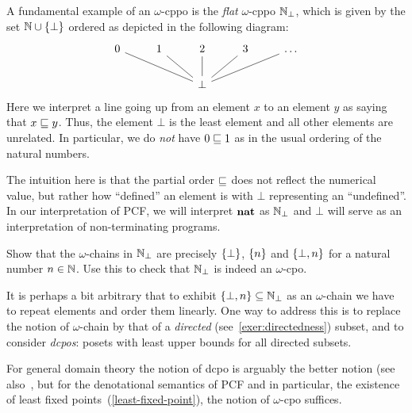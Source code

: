 \begin{example}[\(\Nat_\bot\)]\label{exam:N_bot}
  A fundamental example of an \(\omega\)-cppo is the \emph{flat} \(\omega\)-cppo
  \(\Nat_\bot\), which is given by the set \(\mathbb N \cup \{\bot\}\) ordered as
  depicted in the following diagram:
  \[
    \begin{tikzcd}
      0 & 1 & 2 & 3 & \ldots \\
      & & \bot \ar[ull,no head] \ar[ul,no head] \ar[u,no head] \ar[ur, no head]
      \ar[urr, no head]
    \end{tikzcd}
  \]
  Here we interpret a line going up from an element \(x\) to an element \(y\) as
  saying that \(x \sqsubseteq y\).
  Thus, the element \(\bot\) is the least element and all other elements are
  unrelated.
  In particular, we do \emph{not} have \(0 \sqsubseteq 1\) as in the usual
  ordering of the natural numbers.

  The intuition here is that the partial order \({\sqsubseteq}\) does not reflect the
  numerical value, but rather how ``defined'' an element is with \(\bot\)
  representing an ``undefined''.
  In our interpretation of PCF, we will interpret \(\mathtt{\mathbf{nat}}\) as \(\Nat_\bot\)
  and \(\bot\) will serve as an interpretation of non-terminating programs.
\end{example}

\begin{exercise}\label{exer:N_bot}
  Show that the \(\omega\)-chains in \(\Nat_\bot\) are precisely \(\{\bot\}\),
  \(\{n\}\) and \(\{\bot,n\}\) for a natural number \(n \in \mathbb N\).
  Use this to check that \(\Nat_\bot\) is indeed an \(\omega\)-cpo.
\end{exercise}

\begin{remark}
  It is perhaps a bit arbitrary that to exhibit
  \(\{\bot,n\} \subseteq \mathbb N_\bot\) as an \(\omega\)-chain we have to repeat
  elements and order them linearly.
  One way to address this is to replace the notion of \(\omega\)-chain by that
  of a \emph{directed} (see~\cref{exer:directedness}) subset, and to consider
  \emph{dcpos}: posets with least upper bounds for all directed subsets.

  For general domain theory the notion of dcpo is arguably the better notion
  (see also~\cite[Section~2.2.4]{AbramskyJung1994}, but for the denotational
  semantics of PCF and in particular, the existence of least fixed
  points~(\cref{least-fixed-point}), the notion of \(\omega\)-cpo suffices.
\end{remark}

